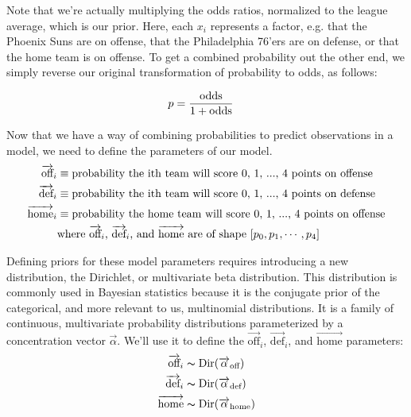 \documentclass[12 pt]{article}
\begin{document}
\begin{flushleft}
Note that we're actually multiplying the odds ratios, normalized to the league average, which is our prior.
Here, each $x_i$ represents a factor, e.g. that the Phoenix Suns are on offense, that the Philadelphia 76'ers are on defense, or that the home team is on offense.
To get a combined probability out the other end, we simply reverse our original transformation of probability to odds, as follows:

\begin{align}
p &= \frac{\text{odds}}{1 + \text{odds}} \notag
\end{align}

Now that we have a way of combining probabilities to predict observations in a model, we need to define the parameters of our model.
\begin{align}
\overrightarrow{\text{off}}_i &\equiv \text{probability the ith team will score 0, 1, ..., 4 points on offense} \notag \\
\overrightarrow{\text{def}}_i &\equiv \text{probability the ith team will score 0, 1, ..., 4 points on defense} \notag \\
\overrightarrow{\text{home}}_i &\equiv \text{probability the home team will score 0, 1, ..., 4 points on offense} \notag \\
&\text{where } \overrightarrow{\text{off}}_i \text{, } \overrightarrow{\text{def}}_i \text{, and } \overrightarrow{\text{home}} \text{ are of shape } [p_0, p_1, \cdots, p_4] \notag
\end{align}

Defining priors for these model parameters requires introducing a new distribution, the Dirichlet, or multivariate beta distribution.
This distribution is commonly used in Bayesian statistics because it is the conjugate prior of the categorical, and more relevant to us, multinomial distributions.
It is a family of continuous, multivariate probability distributions parameterized by a concentration vector $\overrightarrow{\alpha}$.
We'll use it to define the $ \overrightarrow{\text{off}}_i $, $ \overrightarrow{\text{def}}_i $, and $ \overrightarrow{\text{home}} $ parameters:
\begin{align}
\overrightarrow{\text{off}}_i &\thicksim \text{Dir}(\overrightarrow{\alpha}_{\text{off}}) \notag \\
\overrightarrow{\text{def}}_i &\thicksim \text{Dir}(\overrightarrow{\alpha}_{\text{def}}) \notag \\
\overrightarrow{\text{home}} &\thicksim \text{Dir}(\overrightarrow{\alpha}_{\text{home}}) \notag
\end{align}



\end{flushleft}
\end{document}
